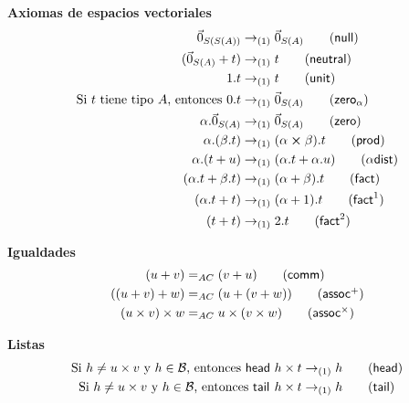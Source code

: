 \textbf{Axiomas de espacios vectoriales}
\begin{align*}
	\nullvec{S(A)}                                              & \reducesto_{(1)} \nullvec{A} \tag{\textsf{null}}                           \\
	(\nullvec{A} + t)                                           & \reducesto_{(1)} t \tag{\textsf{neutral}}                                  \\
	1 . t                                                       & \reducesto_{(1)} t \tag{\textsf{unit}}                                     \\
	\text{Si } t \text{ tiene tipo } A \text{, entonces } 0 . t & \reducesto_{(1)} \nullvec{A} \tag{\( \mathsf{zero}_\alpha \)}              \\
	\alpha . \nullvec{A}                                        & \reducesto_{(1)} \nullvec{A} \tag{\textsf{zero}}                           \\
	\alpha . (\beta . t)                                        & \reducesto_{(1)} (\alpha \cross \beta) . t \tag{\textsf{prod}}             \\
	\alpha . (t + u)                                            & \reducesto_{(1)} (\alpha . t + \alpha . u) \tag{\( \alpha\mathsf{dist} \)} \\
	(\alpha . t + \beta . t)                                    & \reducesto_{(1)} (\alpha + \beta) . t \tag{\textsf{fact}}                  \\
	(\alpha . t + t)                                            & \reducesto_{(1)} (\alpha + 1) . t \tag{\( \mathsf{fact}^1 \)}              \\
	(t + t)                                                     & \reducesto_{(1)} 2 . t \tag{\( \mathsf{fact}^2 \)}
\end{align*}

\textbf{Igualdades}
\begin{align*}
	(u + v)               & =_{AC} (v + u) \tag{\textsf{comm}}                             \\
	((u + v) + w)         & =_{AC} (u + (v + w)) \tag{\(\mathsf{assoc}^+\)}                \\
	(u \times v) \times w & =_{AC} u \times (v \times w) \tag{\(\mathsf{assoc}^{\times}\)}
\end{align*}

\textbf{Listas}
\begin{align*}
	\text{Si } h \neq u \times v \text{ y } h \in \mathcal{B} \text{, entonces } \head{h \times t} & \reducesto_{(1)} h \tag{\textsf{head}} \\
	\text{Si } h \neq u \times v \text{ y } h \in \mathcal{B} \text{, entonces } \tail{h \times t} & \reducesto_{(1)} h \tag{\textsf{tail}}
\end{align*}

